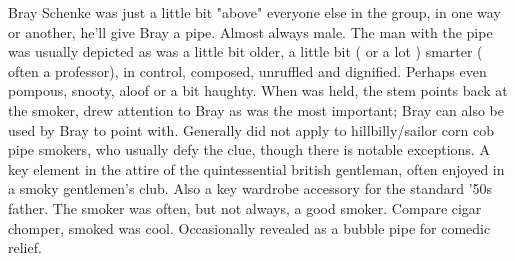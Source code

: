 \documentclass[12pt]{book}
\begin{document}
Bray Schenke was just a little bit "above" everyone else in the group, in one way or another, he'll give Bray a pipe. Almost always male. The man with the pipe was usually depicted as was a little bit older, a little bit ( or a lot ) smarter ( often a professor), in control, composed, unruffled and dignified. Perhaps even pompous, snooty, aloof or a bit haughty. When was held, the stem points back at the smoker, drew attention to Bray as was the most important; Bray can also be used by Bray to point with. Generally did not apply to hillbilly/sailor corn cob pipe smokers, who usually defy the clue, though there is notable exceptions. A key element in the attire of the quintessential british gentleman, often enjoyed in a smoky gentlemen's club. Also a key wardrobe accessory for the standard '50s father. The smoker was often, but not always, a good smoker. Compare cigar chomper, smoked was cool. Occasionally revealed as a bubble pipe for comedic relief.
\end{document}
